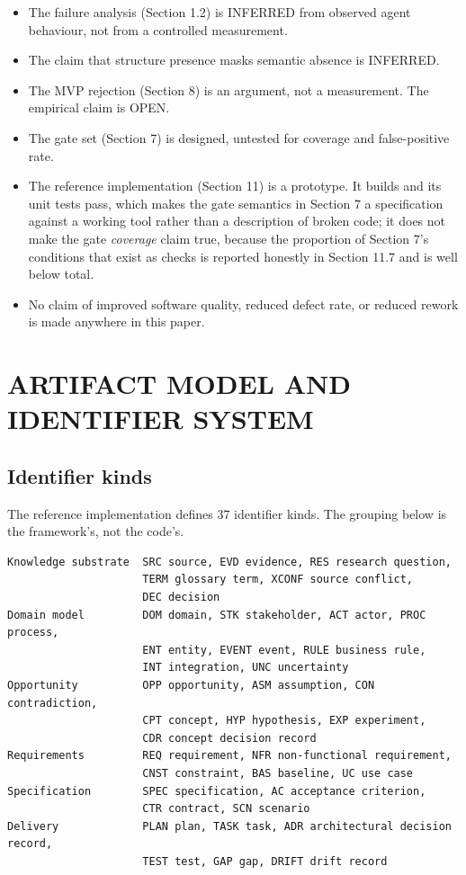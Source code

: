\documentclass[11pt,a4paper]{article}
\begin{document}
\begin{itemize}[leftmargin=*,nosep,topsep=2pt]
\item The failure analysis (Section 1.2) is INFERRED from observed agent   behaviour, not from a controlled measurement.
\item The claim that structure presence masks semantic absence is INFERRED.
\item The MVP rejection (Section 8) is an argument, not a measurement. The   empirical claim is OPEN.
\item The gate set (Section 7) is designed, untested for coverage and   false-positive rate.
\item The reference implementation (Section 11) is a prototype. It builds and   its unit tests pass, which makes the gate semantics in Section 7 a   specification against a working tool rather than a description of broken   code; it does not make the gate \emph{coverage} claim true, because the   proportion of Section 7's conditions that exist as checks is reported   honestly in Section 11.7 and is well below total.
\item No claim of improved software quality, reduced defect rate, or reduced   rework is made anywhere in this paper.
\end{itemize}

\section{ARTIFACT MODEL AND IDENTIFIER SYSTEM}

\subsection{Identifier kinds}

The reference implementation defines 37 identifier kinds. The grouping below is the framework's, not the code's.

\begin{Verbatim}[fontsize=\footnotesize,breaklines=true,breakanywhere=true,breakautoindent=false,samepage=false]
Knowledge substrate  SRC source, EVD evidence, RES research question,
                     TERM glossary term, XCONF source conflict,
                     DEC decision
Domain model         DOM domain, STK stakeholder, ACT actor, PROC process,
                     ENT entity, EVENT event, RULE business rule,
                     INT integration, UNC uncertainty
Opportunity          OPP opportunity, ASM assumption, CON contradiction,
                     CPT concept, HYP hypothesis, EXP experiment,
                     CDR concept decision record
Requirements         REQ requirement, NFR non-functional requirement,
                     CNST constraint, BAS baseline, UC use case
Specification        SPEC specification, AC acceptance criterion,
                     CTR contract, SCN scenario
Delivery             PLAN plan, TASK task, ADR architectural decision record,
                     TEST test, GAP gap, DRIFT drift record
\end{Verbatim}
\end{document}
